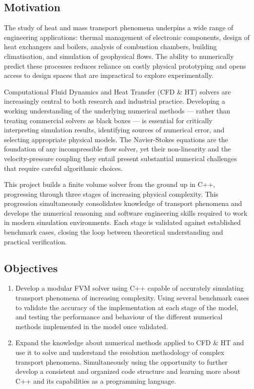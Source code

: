 \subsection*{Motivation}
The study of heat and mass transport phenomena underpins a wide range of engineering applications: thermal management of electronic components, design of heat exchangers and boilers, analysis of combustion chambers, building climatisation, and simulation of geophysical flows. The ability to numerically predict these processes reduces reliance on costly physical prototyping and opens access to design spaces that are impractical to explore experimentally.

Computational Fluid Dynamics and Heat Transfer (CFD \& HT) solvers are increasingly central to both research and industrial practice. Developing a working understanding of the underlying numerical methods --- rather than treating commercial solvers as black boxes --- is essential for critically interpreting simulation results, identifying sources of numerical error, and selecting appropriate physical models. The Navier-Stokes equations are the foundation of any incompressible flow solver, yet their non-linearity and the velocity-pressure coupling they entail present substantial numerical challenges that require careful algorithmic choices.

This project builds a finite volume solver from the ground up in C++, progressing through three stages of increasing physical complexity. This progression simultaneously consolidates knowledge of transport phenomena and develops the numerical reasoning and software engineering skills required to work in modern simulation environments. Each stage is validated against established benchmark cases, closing the loop between theoretical understanding and practical verification.

\subsection*{Objectives}
\begin{enumerate}
    \item{Develop a modular FVM solver using C++ capable of accurately simulating transport phenomena of increasing complexity. Using several benchmark cases to validate the accuracy of the implementation at each stage of the model, and testing the performance and behaviour of the different numerical methods implemented in the model once validated.}
    \item{Expand the knowledge about numerical methods applied to CFD \& HT and use it to solve and understand the resolution methodology of complex transport phenomena. Simultaneously using the opportunity to further develop a consistent and organized code structure and learning more about C++ and its capabilities as a programming language.}
\end{enumerate}


